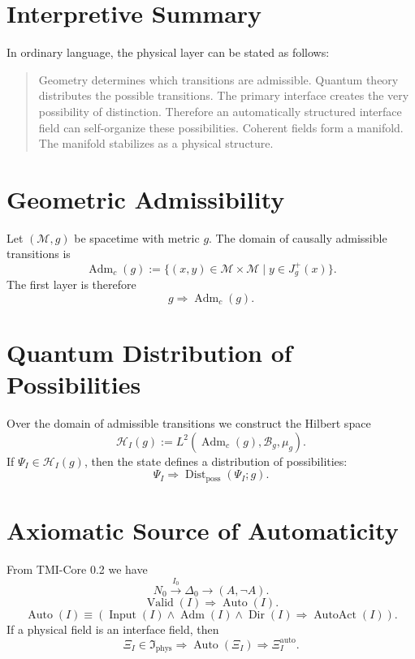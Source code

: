 \documentclass[12pt,a4paper]{article}
\DeclareMathOperator{\Adm}{Adm}
\DeclareMathOperator{\Dist}{Dist}
\DeclareMathOperator{\Valid}{Valid}
\DeclareMathOperator{\Auto}{Auto}
\DeclareMathOperator{\Input}{Input}
\DeclareMathOperator{\Dir}{Dir}
\DeclareMathOperator{\AutoAct}{AutoAct}
\newcommand{\M}{\mathcal M}
\newcommand{\B}{\mathcal B}
\newcommand{\Hcal}{\mathcal H}
\newcommand{\Ispace}{\mathfrak I}
\newcommand{\XiAuto}{\Xi_I^{\mathrm{auto}}}
\begin{document}
\section{Interpretive Summary}
In ordinary language, the physical layer can be stated as follows:
\begin{quote}
Geometry determines which transitions are admissible. Quantum theory distributes the possible transitions. The primary interface creates the very possibility of distinction. Therefore an automatically structured interface field can self-organize these possibilities. Coherent fields form a manifold. The manifold stabilizes as a physical structure.
\end{quote}

\section{Geometric Admissibility}
Let \((\M,g)\) be spacetime with metric \(g\). The domain of causally admissible transitions is
\begin{equation}
\Adm_c(g):=\{(x,y)\in\M\times\M\mid y\in J_g^+(x)\}.
\end{equation}
The first layer is therefore
\begin{equation}
\boxed{g\Rightarrow\Adm_c(g).}
\end{equation}

\section{Quantum Distribution of Possibilities}
Over the domain of admissible transitions we construct the Hilbert space
\begin{equation}
\Hcal_I(g):=L^2(\Adm_c(g),\B_g,\mu_g).
\end{equation}
If \(\Psi_I\in\Hcal_I(g)\), then the state defines a distribution of possibilities:
\begin{equation}
\boxed{\Psi_I\Rightarrow\Dist_{\mathrm{poss}}(\Psi_I;g).}
\end{equation}

\section{Axiomatic Source of Automaticity}
From TMI-Core 0.2 we have
\begin{equation}
\boxed{N_0\xrightarrow{I_0}\Delta_0\to(A,\neg A).}
\end{equation}
\begin{equation}
\boxed{\Valid(I)\Rightarrow\Auto(I).}
\end{equation}
\begin{equation}
\boxed{\Auto(I)\equiv(\Input(I)\land\Adm(I)\land\Dir(I)\Rightarrow\AutoAct(I)).}
\end{equation}
If a physical field is an interface field, then
\begin{equation}
\boxed{\Xi_I\in\Ispace_{\mathrm{phys}}\Rightarrow\Auto(\Xi_I)\Rightarrow\XiAuto.}
\end{equation}
\end{document}

